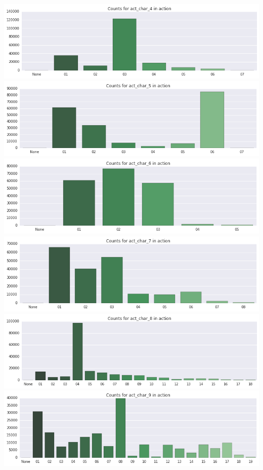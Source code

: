 \documentclass[]{report}
\begin{document}
\includegraphics{assets/img/BarPlots_6_3.png}
\includegraphics{assets/img/BarPlots_6_4.png}
\includegraphics{assets/img/BarPlots_6_5.png}
\includegraphics{assets/img/BarPlots_6_6.png}
\includegraphics{assets/img/BarPlots_6_7.png}
\includegraphics{assets/img/BarPlots_6_8.png}
\end{document}
